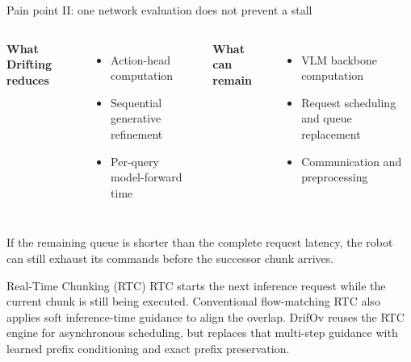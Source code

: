 \documentclass[aspectratio=169,10pt]{beamer}
\begin{document}
\begin{frame}{Pain point II: one network evaluation does not prevent a stall}
  \begin{columns}[T]
      \textbf{What Drifting reduces}
      \begin{itemize}
        \item Action-head computation
        \item Sequential generative refinement
        \item Per-query model-forward time
      \end{itemize}
      \textbf{What can remain}
      \begin{itemize}
        \item VLM backbone computation
        \item Request scheduling and queue replacement
        \item Communication and preprocessing
      \end{itemize}
  \end{columns}

  \vspace{0.5em}
  If the remaining queue is shorter than the complete request latency, the robot
  can still exhaust its commands before the successor chunk arrives.

  \begin{block}{Real-Time Chunking (RTC)}
    RTC starts the next inference request while the current chunk is still being
    executed. Conventional flow-matching RTC also applies soft inference-time
    guidance to align the overlap. DrifOv reuses the RTC engine for asynchronous
    scheduling, but replaces that multi-step guidance with learned prefix
    conditioning and exact prefix preservation.
  \end{block}
\end{frame}
\end{document}
